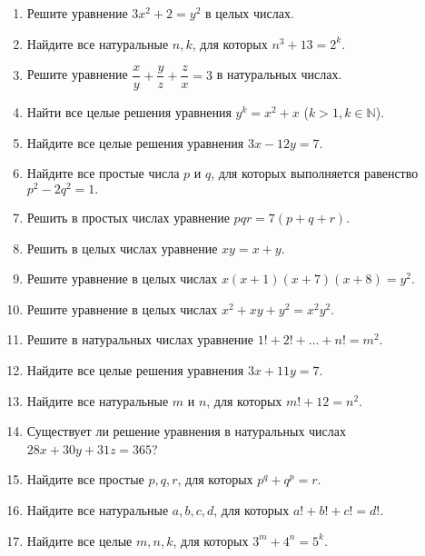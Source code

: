 \documentclass{article}
\begin{document}
\begin{enumerate}[label*=\protect\fbox{\arabic{enumi}}]
	
\item Решите уравнение $3x^2 + 2 = y^2$ в целых числах.
	
\item Найдите все натуральные $n, k$, для которых $n^3 + 13 = 2^k$.
	
\item Решите уравнение $\dfrac{x}{y} + \dfrac{y}{z} + \dfrac{z}{x} = 3$ в натуральных числах.

\item Найти все целые решения уравнения  $y^k = x^2 + x $ ($k > 1, k \in \mathbb{N}$).

\item Найдите все целые решения уравнения $3x - 12y = 7.$

\item Найдите все простые числа $p$ и $q$, для которых выполняется равенство  $p^2 - 2q^2 = 1.$

\item Решить в простых числах уравнение  $pqr = 7(p + q + r).$  

\item Решить в целых числах уравнение  $xy = x + y.$

\item Решите уравнение в целых числах  $x(x+1)(x+7)(x+8) = y^2.$

\item Решите уравнение в целых числах  $x^2 + xy + y^2 = x^2y^2.$

\item Решите в натуральных числах уравнение   $1! + 2! + ... + n! = m^2$.

\item Найдите все целые решения уравнения $3x + 11y = 7.$

\item Найдите все натуральные $m$ и $n$, для которых $m! + 12 = n^2$.

\item Существует ли решение уравнения в натуральных числах $28x + 30y+ 31z = 365$?

\item Найдите все простые $p, q, r$, для которых $p^q + q^p = r$.

\item Найдите все натуральные $a, b, c, d$, для которых $a!+b!+c! = d!$.

\item Найдите все целые $m, n, k$, для которых $3^m + 4^n = 5^k$.


\end{enumerate}
\end{document}
